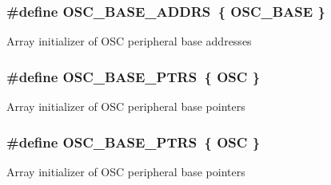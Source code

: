 \subsubsection[{\texorpdfstring{O\+S\+C\+\_\+\+B\+A\+S\+E\+\_\+\+A\+D\+D\+RS}{OSC_BASE_ADDRS}}]{\setlength{\rightskip}{0pt plus 5cm}\#define O\+S\+C\+\_\+\+B\+A\+S\+E\+\_\+\+A\+D\+D\+RS~\{ {\bf O\+S\+C\+\_\+\+B\+A\+SE} \}}\hypertarget{group__OSC__Peripheral__Access__Layer_ga31b4aa65d54d63cd13bdf2915e86f31a}{}\label{group__OSC__Peripheral__Access__Layer_ga31b4aa65d54d63cd13bdf2915e86f31a}
Array initializer of O\+SC peripheral base addresses 
\subsubsection[{\texorpdfstring{O\+S\+C\+\_\+\+B\+A\+S\+E\+\_\+\+P\+T\+RS}{OSC_BASE_PTRS}}]{\setlength{\rightskip}{0pt plus 5cm}\#define O\+S\+C\+\_\+\+B\+A\+S\+E\+\_\+\+P\+T\+RS~\{ {\bf O\+SC} \}}\hypertarget{group__OSC__Peripheral__Access__Layer_ga46f69fcb9d660e18b5cbf51adbbcec78}{}\label{group__OSC__Peripheral__Access__Layer_ga46f69fcb9d660e18b5cbf51adbbcec78}
Array initializer of O\+SC peripheral base pointers 
\subsubsection[{\texorpdfstring{O\+S\+C\+\_\+\+B\+A\+S\+E\+\_\+\+P\+T\+RS}{OSC_BASE_PTRS}}]{\setlength{\rightskip}{0pt plus 5cm}\#define O\+S\+C\+\_\+\+B\+A\+S\+E\+\_\+\+P\+T\+RS~\{ {\bf O\+SC} \}}\hypertarget{group__OSC__Peripheral__Access__Layer_ga46f69fcb9d660e18b5cbf51adbbcec78}{}\label{group__OSC__Peripheral__Access__Layer_ga46f69fcb9d660e18b5cbf51adbbcec78}
Array initializer of O\+SC peripheral base pointers 